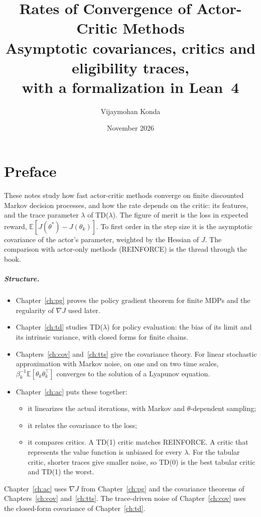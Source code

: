 \documentclass[11pt,oneside]{book}
\title{Rates of Convergence of Actor-Critic Methods\\[6pt]
  \large Asymptotic covariances, critics and eligibility traces,\\
  with a formalization in Lean~4}
\author{Vijaymohan Konda}
\date{November 2026}
\theoremstyle{definition}
\theoremstyle{remark}
\numberwithin{equation}{chapter}
\newcommand{\E}{\mathbb{E}}
\begin{document}
\maketitle
\frontmatter

\chapter{Preface}

These notes study how fast actor-critic methods converge on finite discounted Markov
decision processes, and how the rate depends on the critic: its features, and the trace
parameter $\lambda$ of TD($\lambda$). The figure of merit is the loss in expected reward,
$\E[J(\theta^*) - J(\theta_k)]$. To first order in the step size it is the asymptotic covariance of the
actor's parameter, weighted by the Hessian of $J$. The comparison with actor-only methods
(REINFORCE) is the thread through the book.

\paragraph{Structure.}
\begin{itemize}
\item Chapter~\ref{ch:pg} proves the policy gradient theorem for finite MDPs and the regularity of
  $\nabla J$ used later.
\item Chapter~\ref{ch:td} studies TD($\lambda$) for policy evaluation: the bias of its limit and its
  intrinsic variance, with closed forms for finite chains.
\item Chapters~\ref{ch:cov} and~\ref{ch:tts} give the covariance theory. For linear stochastic
  approximation with Markov noise, on one and on two time scales, $\beta_k^{-1}\E[\theta_k\theta_k^\top]$
  converges to the solution of a Lyapunov equation.
\item Chapter~\ref{ch:ac} puts these together:
  \begin{itemize}
  \item it linearizes the actual iterations, with Markov and $\theta$-dependent sampling;
  \item it relates the covariance to the loss;
  \item it compares critics. A TD(1) critic matches REINFORCE. A critic that represents the value
    function is unbiased for every $\lambda$. For the tabular critic, shorter traces give smaller
    noise, so TD(0) is the best tabular critic and TD(1) the worst.
  \end{itemize}
\end{itemize}
Chapter~\ref{ch:ac} uses $\nabla J$ from Chapter~\ref{ch:pg} and the covariance theorems of
Chapters~\ref{ch:cov} and~\ref{ch:tts}. The trace-driven noise of Chapter~\ref{ch:cov} uses the
closed-form covariance of Chapter~\ref{ch:td}.
\end{document}
